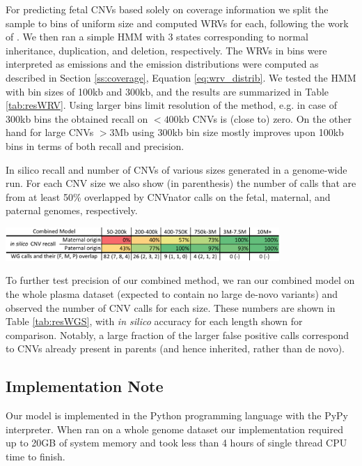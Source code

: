 For predicting fetal CNVs based solely on coverage information we split the sample to bins of uniform size and computed WRVs for each, following the work of \cite{srinivasan2013}. We then ran a simple HMM with 3 states corresponding to normal inheritance, duplication, and deletion, respectively. The WRVs in bins were interpreted as emissions and the emission distributions were computed as described in Section \ref{ss:coverage}, Equation \ref{eq:wrv_distrib}. We tested the HMM with bin sizes of 100kb and 300kb, and the results are summarized in Table \ref{tab:resWRV}. Using larger bins limit resolution of the method, e.g. in case of 300kb bins the obtained recall on ${<400}$kb CNVs is (close to) zero. On the other hand for large CNVs ${>3}$Mb using 300kb bin size mostly improves upon 100kb bins in terms of both recall and precision.

\begin{table}
\caption{In silico recall and number of CNVs of various sizes generated in a genome-wide run. For each CNV size we also show (in parenthesis) the number of calls that are from at least 50\% overlapped by CNVnator \citep{abyzov2011cnvnator} calls on the fetal, maternal, and paternal genomes, respectively.}
\label{tab:resWGS}
\centering
\includegraphics[width=0.78\textwidth]{figures/wg_calls_color}
\end{table}

To further test precision of our combined method, we ran our combined model on the whole plasma dataset (expected to contain no large de-novo variants) and observed the number of CNV calls for each size. These numbers are shown in Table \ref{tab:resWGS}, with \textit{in silico} accuracy for each length shown for comparison. Notably, a large fraction of the larger false positive calls correspond to CNVs already present in parents (and hence inherited, rather than de novo). 

\subsection{Implementation Note}
Our model is implemented in the Python programming language with the PyPy interpreter. When ran on a 	whole genome dataset our implementation required up to 20GB of system memory and took less than 4 hours of single thread CPU time to finish.
